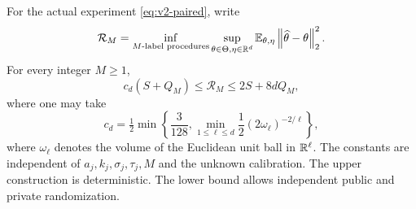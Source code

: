 \begin{theorem}
\label{thm:v2-singular}
For the actual experiment \eqref{eq:v2-paired}, write
\[
 \mathcal R_M=\inf_{\text{$M$-label procedures}}\sup_{\theta\in\Theta,\eta\in\mathbb R^d}
      \mathbb E_{\theta,\eta}\left\lVert \widehat\theta-\theta\right\rVert_2^2.
\]
For every integer $M\ge1$,
\begin{equation}\label{eq:v2-statlaw}
 c_d(S+Q_M)\le\mathcal R_M\le2S+8dQ_M,
\end{equation}
where one may take
\[
 c_d=\tfrac12\min\left\{\frac3{128},
   \min_{1\le\ell\le d}\frac12(2\omega_\ell)^{-2/\ell}\right\},
\]
where $\omega_\ell$ denotes the volume of the Euclidean unit ball in $\mathbb R^\ell$.
The constants are independent of $a_j,k_j,\sigma_j,\tau_j,M$ and the
unknown calibration. The upper construction is deterministic. The lower
bound allows independent public and private randomization.
\end{theorem}
